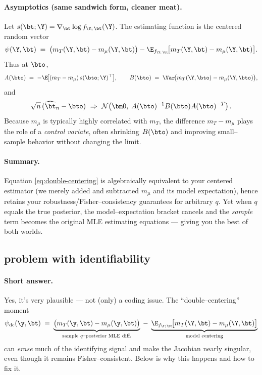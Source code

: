 \paragraph{Asymptotics (same sandwich form, cleaner meat).}
Let $s(\bt;\Y)=\nabla_\bt\log f_{\Y;\,\bt}(\Y)$.
The estimating function is the centered random vector
\[
\psi(\Y,\bt)\;=\;\big(m_T(\Y,\bt)-m_\mu(\Y,\bt)\big)
-\E_{f_{\Y;\,\bt}}\!\big[m_T(\Y,\bt)-m_\mu(\Y,\bt)\big].
\]
Thus at $\bto$,
\[
A(\bto)\;=\;-\E\!\big[(m_T-m_\mu)\,s(\bto;\Y)^\top\big],
\qquad
B(\bto)\;=\;\Var\!\big(m_T(\Y,\bto)-m_\mu(\Y,\bto)\big),
\]
and
\[
\sqrt{n}\,(\widehat\bt_n-\bto)\ \Rightarrow\ \mathcal N\!\left(\bm 0,\;A(\bto)^{-1}B(\bto)A(\bto)^{-T}\right).
\]
Because $m_\mu$ is typically highly correlated with $m_T$, the difference $m_T-m_\mu$ plays the role of a \emph{control variate}, often shrinking $B(\bto)$ and improving small–sample behavior without changing the limit.
 
\paragraph{Summary.}
Equation \eqref{eq:double-centering} is algebraically equivalent to your centered estimator (we merely added and subtracted $m_\mu$ and its model expectation), hence retains your robustness/Fisher–consistency guarantees for arbitrary $q$. Yet when $q$ equals the true posterior, the model–expectation bracket cancels and the \emph{sample} term becomes the original MLE estimating equations — giving you the best of both worlds.



\subsection{problem with identifiability}

\paragraph{Short answer.} Yes, it’s very plausible — not (only) a coding issue. 
The “double–centering” moment
\[
\psi_{\mathrm{dc}}(\y,\bt)\;=\;\underbrace{\big(m_T(\y,\bt)-m_\mu(\y,\bt)\big)}_{\text{sample $q$–posterior MLE diff.}}
\;-\;\underbrace{\E_{f_{\Y;\,\bt}}\!\big[m_T(\Y,\bt)-m_\mu(\Y,\bt)\big]}_{\text{model centering}}
\]
can \emph{erase} much of the identifying signal and make the Jacobian nearly singular, even though it remains Fisher–consistent. Below is why this happens and how to fix it.

